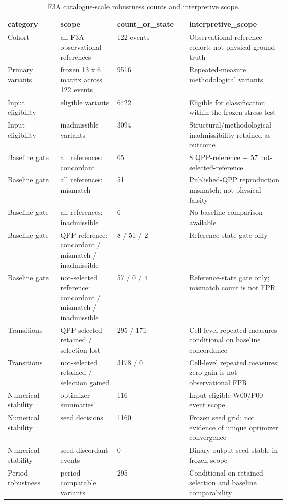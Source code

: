 \begin{table}[t]
\centering
\small
\caption{F3A catalogue-scale robustness counts and interpretive scope.}
\label{tab:m1\_f3a\_counts}
\begin{tabular}{p{0.16\linewidth}p{0.16\linewidth}p{0.16\linewidth}p{0.16\linewidth}}
\hline
\textbf{category} & \textbf{scope} & \textbf{count\_or\_state} & \textbf{interpretive\_scope} \\
\hline
Cohort & all F3A observational references & 122 events & Observational reference cohort; not physical ground truth \\
Primary variants & frozen 13 x 6 matrix across 122 events & 9516 & Repeated-measure methodological variants \\
Input eligibility & eligible variants & 6422 & Eligible for classification within the frozen stress test \\
Input eligibility & inadmissible variants & 3094 & Structural/methodological inadmissibility retained as outcome \\
Baseline gate & all references: concordant & 65 & 8 QPP-reference + 57 not-selected-reference \\
Baseline gate & all references: mismatch & 51 & Published-QPP reproduction mismatch; not physical falsity \\
Baseline gate & all references: inadmissible & 6 & No baseline comparison available \\
Baseline gate & QPP reference: concordant / mismatch / inadmissible & 8 / 51 / 2 & Reference-state gate only \\
Baseline gate & not-selected reference: concordant / mismatch / inadmissible & 57 / 0 / 4 & Reference-state gate only; mismatch count is not FPR \\
Transitions & QPP selected retained / selection lost & 295 / 171 & Cell-level repeated measures conditional on baseline concordance \\
Transitions & not-selected retained / selection gained & 3178 / 0 & Cell-level repeated measures; zero gain is not observational FPR \\
Numerical stability & optimizer summaries & 116 & Input-eligible W00/P00 event scope \\
Numerical stability & seed decisions & 1160 & Frozen seed grid; not evidence of unique optimizer convergence \\
Numerical stability & seed-discordant events & 0 & Binary output seed-stable in frozen scope \\
Period robustness & period-comparable variants & 295 & Conditional on retained selection and baseline comparability \\
\hline
\end{tabular}
\end{table}
